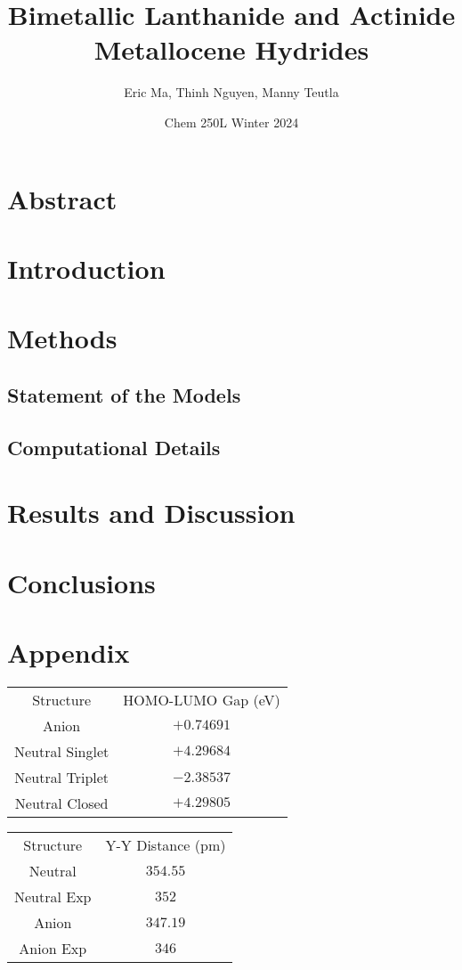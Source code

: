 \documentclass{article}
\title{Bimetallic Lanthanide and Actinide Metallocene Hydrides}
\author{Eric Ma, Thinh Nguyen, Manny Teutla}
\date{Chem 250L Winter 2024}
\begin{document}
\maketitle

\section{Abstract}

\section{Introduction}

\section{Methods}
\subsection{Statement of the Models}
\subsection{Computational Details}

\section{Results and Discussion}

\section{Conclusions}

\section*{Appendix}
\begin{tabular}{cc}
	Structure & HOMO-LUMO Gap (eV) \\
	Anion & $+0.74691$ \\
	Neutral Singlet & $+4.29684$ \\
	Neutral Triplet & $-2.38537$ \\
	Neutral Closed & $+4.29805$
\end{tabular}

\begin{tabular}{cc}
	Structure & Y-Y Distance (pm) \\
	Neutral & $354.55$ \\
	Neutral Exp & $352$ \\
	Anion & $347.19$ \\
	Anion Exp & $346$
\end{tabular}
\end{document}
